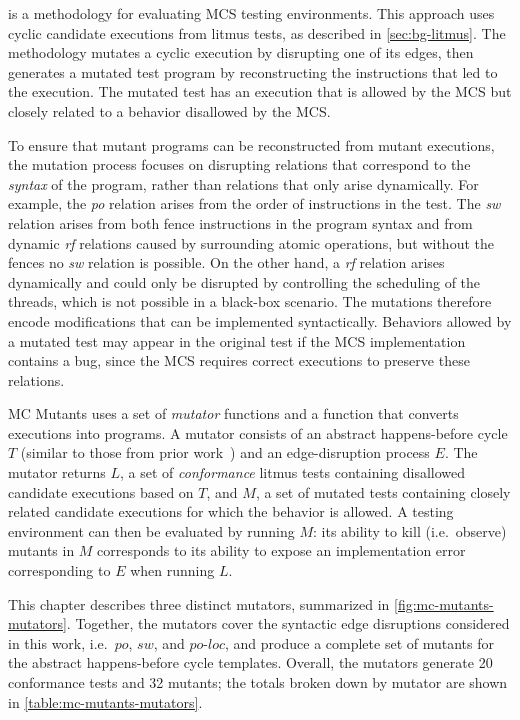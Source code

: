 \sys is a methodology for evaluating MCS testing environments. This approach uses cyclic candidate executions from litmus tests, as described in \mysec\ref{sec:bg-litmus}. The methodology mutates a cyclic execution by disrupting one of its edges, then generates a mutated test program by reconstructing the instructions that led to the execution. The mutated test has an execution that is allowed by the MCS but closely related to a behavior disallowed by the MCS.

To ensure that mutant programs can be reconstructed from mutant executions, the mutation process focuses on disrupting relations that correspond to the \textit{syntax} of the program, rather than relations that only arise dynamically. For example, the \textit{po} relation arises from the order of instructions in the test. The \textit{sw} relation arises from both fence instructions in the program syntax and from dynamic \textit{rf} relations caused by surrounding atomic operations, but without the fences no \textit{sw} relation is possible. On the other hand, a \textit{rf} relation arises dynamically and could only be disrupted by controlling the scheduling of the threads, which is not possible in a black-box scenario. The mutations therefore encode modifications that can be implemented syntactically. Behaviors allowed by a mutated test may appear in the original test if the MCS implementation contains a bug, since the MCS requires correct executions to preserve these relations.

MC Mutants uses a set of \textit{mutator} functions and a function that converts executions into programs. A mutator consists of an abstract happens-before cycle $T$ (similar to those from prior work~\cite{alglave2010fences}) and an edge-disruption process $E$. The mutator returns $L$, a set of \textit{conformance} litmus tests containing disallowed candidate executions based on $T$, and $M$, a set of mutated tests containing closely related candidate executions for which the behavior is allowed. A testing environment can then be evaluated by running $M$: its ability to kill (i.e.\ observe) mutants in $M$ corresponds to its ability to expose an implementation error corresponding to $E$ when running $L$.


This chapter describes three distinct mutators, summarized in \myfig\ref{fig:mc-mutants-mutators}. Together, the mutators cover the syntactic edge disruptions considered in this work, i.e.\ $po$, $sw$, and $\textit{po-loc}$, and produce a complete set of mutants for the abstract happens-before cycle templates. Overall, the mutators generate 20 conformance tests and 32 mutants; the totals broken down by mutator are shown in \mytab\ref{table:mc-mutants-mutators}.

